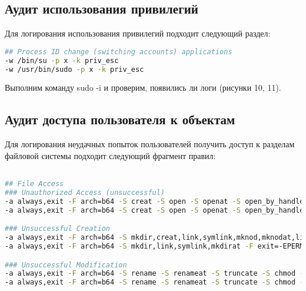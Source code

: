\FloatBarrier

\FloatBarrier



\subsection{Аудит использования привилегий}
Для логирования использования привилегий подходит следующий раздел:

\begin{lstlisting}[language=bash, numbers=none, caption={Аудит использования привилегий}]
## Process ID change (switching accounts) applications
-w /bin/su -p x -k priv_esc
-w /usr/bin/sudo -p x -k priv_esc
\end{lstlisting}

Выполним команду sudo -i и проверим, появились ли логи (рисунки 10, 11). 

\FloatBarrier

\FloatBarrier


\subsection{Аудит доступа пользователя к объектам}
Для логирования неудачных попыток пользователей получить доступ к разделам файловой системы подходит следующий фрагмент правил:

\begin{lstlisting}[language=bash, numbers=none, caption={Аудит доступа пользователя к объектам}]

## File Access
### Unauthorized Access (unsuccessful)
-a always,exit -F arch=b64 -S creat -S open -S openat -S open_by_handle_at -S truncate -S ftruncate -F exit=-EACCES -F auid>=1000 -F auid!=-1 -k file_access
-a always,exit -F arch=b64 -S creat -S open -S openat -S open_by_handle_at -S truncate -S ftruncate -F exit=-EPERM -F auid>=1000 -F auid!=-1 -k file_access

### Unsuccessful Creation
-a always,exit -F arch=b64 -S mkdir,creat,link,symlink,mknod,mknodat,linkat,symlinkat -F exit=-EACCES -k file_creation
-a always,exit -F arch=b64 -S mkdir,link,symlink,mkdirat -F exit=-EPERM -k file_creation

### Unsuccessful Modification
-a always,exit -F arch=b64 -S rename -S renameat -S truncate -S chmod -S setxattr -S lsetxattr -S removexattr -S lremovexattr -F exit=-EACCES -k file_modification
-a always,exit -F arch=b64 -S rename -S renameat -S truncate -S chmod -S setxattr -S lsetxattr -S removexattr -S lremovexattr -F exit=-EPERM -k file_modification
\end{lstlisting}

